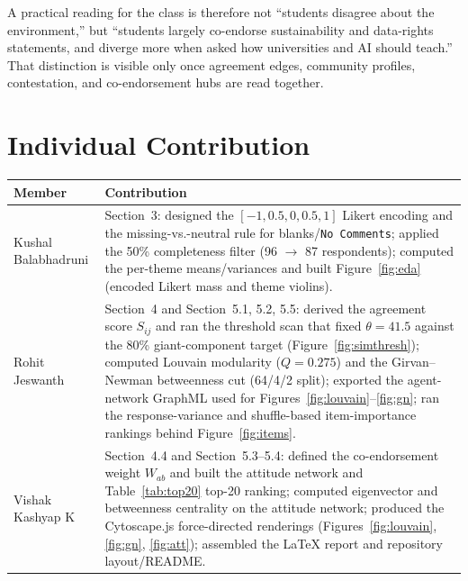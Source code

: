 \documentclass[10pt]{article}
\begin{document}
A practical reading for the class is therefore not ``students disagree about the
environment,'' but ``students largely co-endorse sustainability and data-rights
statements, and diverge more when asked how universities and AI should teach.'' That
distinction is visible only once agreement edges, community profiles, contestation, and
co-endorsement hubs are read together.

\section{Individual Contribution}

\begin{table}[H]
\centering
\small
\begin{tabular}{@{}p{3.6cm}p{11.0cm}@{}}
\toprule
\textbf{Member} & \textbf{Contribution} \\
\midrule
Kushal Balabhadruni &
Section~3: designed the $[-1,0.5,0,0.5,1]$ Likert encoding and the missing-vs.-neutral
rule for blanks/\texttt{No Comments}; applied the 50\% completeness filter (96
$\rightarrow$ 87 respondents); computed the per-theme means/variances and built
Figure~\ref{fig:eda} (encoded Likert mass and theme violins). \\
\midrule
Rohit Jeswanth &
Section~4 and Section~5.1, 5.2, 5.5: derived the agreement score $S_{ij}$ and ran the
threshold scan that fixed $\theta=41.5$ against the 80\% giant-component target
(Figure~\ref{fig:simthresh}); computed Louvain modularity ($Q=0.275$) and the
Girvan--Newman betweenness cut (64/4/2 split); exported the agent-network GraphML used
for Figures~\ref{fig:louvain}--\ref{fig:gn}; ran the response-variance and
shuffle-based item-importance rankings behind Figure~\ref{fig:items}. \\
\midrule
Vishak Kashyap K &
Section~4.4 and Section~5.3--5.4: defined the co-endorsement weight $W_{ab}$ and built
the attitude network and Table~\ref{tab:top20} top-20 ranking; computed eigenvector and
betweenness centrality on the attitude network; produced the Cytoscape.js force-directed
renderings (Figures~\ref{fig:louvain}, \ref{fig:gn}, \ref{fig:att}); assembled the LaTeX
report and repository layout/README. \\
\bottomrule
\end{tabular}
\end{table}

\end{document}
